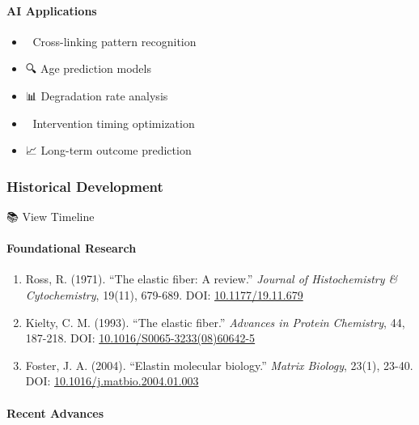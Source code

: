 \paragraph{AI Applications}\label{ai-applications-2}

\begin{itemize}
\tightlist
\item
  🤖 Cross-linking pattern recognition
\item
  🔍 Age prediction models
\item
  📊 Degradation rate analysis
\item
  🎯 Intervention timing optimization
\item
  📈 Long-term outcome prediction
\end{itemize}

\subsubsection{Historical Development}\label{historical-development}

📚 View Timeline

\paragraph{Foundational Research}\label{foundational-research}

\begin{enumerate}
\def\labelenumi{\arabic{enumi}.}
\item
  Ross, R. (1971). ``The elastic fiber: A review.'' \emph{Journal of
  Histochemistry \& Cytochemistry}, 19(11), 679-689. DOI:
  \href{https://doi.org/10.1177/19.11.679}{10.1177/19.11.679}
\item
  Kielty, C. M. (1993). ``The elastic fiber.'' \emph{Advances in Protein
  Chemistry}, 44, 187-218. DOI:
  \href{https://doi.org/10.1016/S0065-3233(08)60642-5}{10.1016/S0065-3233(08)60642-5}
\item
  Foster, J. A. (2004). ``Elastin molecular biology.'' \emph{Matrix
  Biology}, 23(1), 23-40. DOI:
  \href{https://doi.org/10.1016/j.matbio.2004.01.003}{10.1016/j.matbio.2004.01.003}
\end{enumerate}

\paragraph{Recent Advances}\label{recent-advances}

